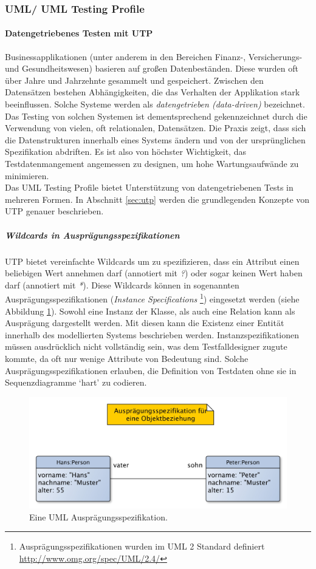\subsubsection{UML/ UML Testing Profile}
\paragraph{Datengetriebenes Testen mit UTP} 
Businessapplikationen (unter anderem in den Bereichen Finanz-, Versicherungs- und Gesundheitswesen) basieren auf großen Datenbeständen. Diese wurden oft über Jahre und Jahrzehnte gesammelt und gespeichert. Zwischen den Datensätzen bestehen Abhängigkeiten, die das Verhalten der Applikation stark beeinflussen. Solche Systeme werden als \textit{datengetrieben (data-driven)} bezeichnet. Das Testing von solchen Systemen ist dementsprechend gekennzeichnet durch die Verwendung von vielen, oft relationalen, Datensätzen. Die Praxis zeigt, dass sich die Datenstrukturen innerhalb eines Systems ändern und von der ursprünglichen Spezifikation abdriften. Es ist also von höchster Wichtigkeit, das Testdatenmangement angemessen zu designen, um hohe Wartungsaufwände zu minimieren. \cite{baker_model-driven_2005}\\
Das UML Testing Profile bietet Unterstützung von datengetriebenen Tests in mehreren Formen. In Abschnitt \ref{sec:utp} werden die grundlegenden Konzepte von UTP genauer beschrieben.

\subparagraph{Wildcards in Ausprägungsspezifikationen}
UTP bietet vereinfachte Wildcards um zu spezifizieren, dass ein Attribut einen beliebigen Wert annehmen darf (annotiert mit \textit{?}) oder sogar keinen Wert haben darf (annotiert mit \textit{*}). Diese Wildcards können in sogenannten Ausprägungsspezifikationen (\textit{Instance Specifications} \footnote{Ausprägungsspezifikationen wurden im UML 2 Standard definiert \url{http://www.omg.org/spec/UML/2.4/} }) eingesetzt werden (siehe Abbildung \ref{fig:uml_instance}). Sowohl eine Instanz der Klasse, als auch eine Relation kann als Ausprägung dargestellt werden. Mit diesen kann die Existenz einer Entität innerhalb des modellierten Systems beschrieben werden. Instanzspezifikationen müssen ausdrücklich nicht vollständig sein, was dem  Testfalldesigner zugute kommte, da oft nur wenige Attribute von Bedeutung sind. Solche Ausprägungsspezifikationen erlauben, die Definition von Testdaten ohne sie in Sequenzdiagramme `hart' zu codieren.
 
\begin{figure}[h] 
  \centering
     \includegraphics[width=1.0\textwidth]{figures/uml_instance.jpeg}
  \caption{Eine UML Ausprägungsspezifikation.}
  \label{fig:uml_instance}
\end{figure}


